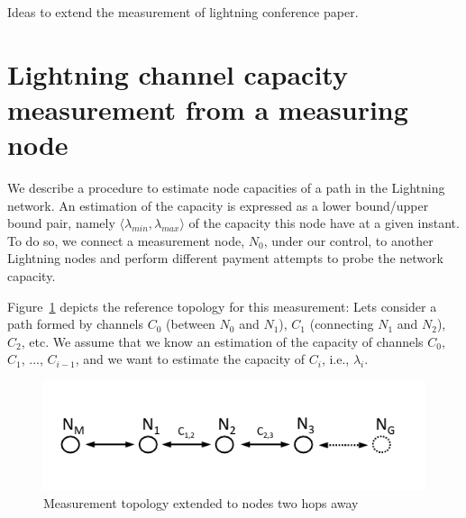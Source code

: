 Ideas to extend the measurement of lightning conference paper.



\section{Lightning channel capacity measurement from a measuring node}
We describe a procedure to estimate node capacities of a path in the Lightning network. 
An estimation of the capacity is expressed as a lower bound/upper bound pair, namely $\langle \lambda_{min}, \lambda_{max} \rangle$ of the capacity this node have at a given instant. 
To do so, we connect a measurement node, $N_0$, under our control, to another Lightning nodes and perform different payment attempts to probe the network capacity.

Figure~\ref{fig:measurement-topology-extended} depicts the reference topology for this measurement: 
Lets consider a path formed by channels $C_0$ (between $N_0$ and $N_1$), $C_1$ (connecting $N_1$ and $N_2$), $C_2$, etc.
We assume that we know an estimation of the capacity of channels $C_0$, $C_1$, ..., $C_{i-1}$, and we want to estimate the capacity of $C_i$, i.e., $\lambda_i$.


\begin{figure}[h!]
    \centering
    \includegraphics[width=0.95\linewidth]{img/measurement-topology-extended.pdf}
    \caption{Measurement topology extended to nodes two hops away}
    \label{fig:measurement-topology-extended}
\end{figure}


